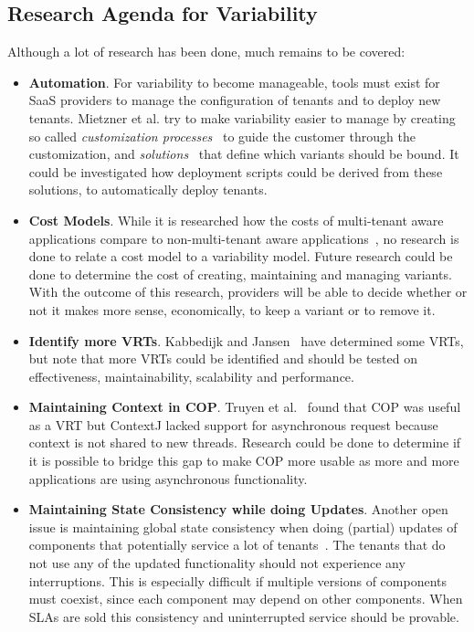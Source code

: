 \subsection{Research Agenda for Variability}\label{sec:var_agenda}
Although a lot of research has been done, much remains to be covered:
\begin{itemize}

\item \textbf{Automation}.
For variability to become manageable, tools must exist for \ac{SaaS} providers to manage the configuration of tenants and to deploy new tenants. Mietzner et al. try to make variability easier to manage by creating so called \textit{customization processes}~\cite{mietzner2008generation} to guide the customer through the customization, and \textit{solutions}~\cite{mietzner2008defining} that define which variants should be bound. It could be investigated how deployment scripts could be derived from these solutions, to automatically deploy tenants.

\item \textbf{Cost Models}.
While it is researched how the costs of multi-tenant aware applications compare to non-multi-tenant aware applications~\cite{mietzner2009variability}, no research is done to relate a cost model to a variability model. Future research could be done to determine the cost of creating, maintaining and managing variants. With the outcome of this research, providers will be able to decide whether or not it makes more sense, economically, to keep a variant or to remove it.

\item \textbf{Identify more \aclp{VRT}}. 
Kabbedijk and Jansen~\cite{kabbedijk2011variability} have determined some \acp{VRT}, but note that more \acp{VRT} could be identified and should be tested on effectiveness, maintainability, scalability and performance.

\item \textbf{Maintaining Context in \ac{COP}}. 
Truyen et al.~\cite{truyen2012context} found that \ac{COP} was useful as a \ac{VRT} but ContextJ lacked support for asynchronous request because context is not shared to new threads. Research could be done to determine if it is possible to bridge this gap to make \ac{COP} more usable as more and more applications are using asynchronous functionality.

\item \textbf{Maintaining State Consistency while doing Updates}.
Another open issue is maintaining global state consistency when doing (partial) updates of components that potentially service a lot of tenants~\cite{truyen2012context,dumitracs2009upgrades}. The tenants that do not use any of the updated functionality should not experience any interruptions. This is especially difficult if multiple versions of components must coexist, since each component may depend on other components. When \acp{SLA} are sold this consistency and uninterrupted service should be provable.

\end{itemize}
